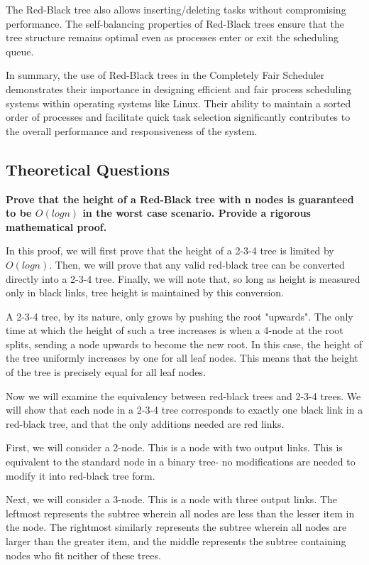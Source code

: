 \documentclass[12pt]{amsart}
\begin{document}
   The Red-Black tree also allows inserting/deleting tasks
   without compromising performance. The self-balancing
   properties of Red-Black trees ensure that the tree structure
   remains optimal even as processes enter or exit the
   scheduling queue.
   
   In summary, the use of Red-Black trees in the Completely Fair
   Scheduler demonstrates their  importance in designing
   efficient and fair process scheduling systems within
   operating systems like Linux. Their ability to maintain a
   sorted order of processes and facilitate quick task selection
   significantly contributes to the overall performance and
   responsiveness of the system.

\subsection{Theoretical Questions}

    \textbf{Prove that the height of a Red-Black tree with
    n nodes is guaranteed to be $O(log n)$ in the worst
    case scenario. Provide a rigorous mathematical proof.}
    
    In this proof, we will first prove that the height of a
    2-3-4 tree is limited by $O(log n)$. Then, we will prove
    that any valid red-black tree can be converted directly into
    a 2-3-4 tree. Finally, we will note that, so long as height
    is measured only in black links, tree height is maintained
    by this conversion.

    A 2-3-4 tree, by its nature, only grows by pushing the root
    "upwards". The only time at which the height of such a tree
    increases is when a 4-node at the root splits, sending a
    node upwards to become the new root. In this case, the
    height of the tree uniformly increases by one for all leaf
    nodes. This means that the height of the tree is precisely
    equal for all leaf nodes.

    Now we will examine the equivalency between red-black trees
    and 2-3-4 trees. We will show that each node in a 2-3-4 tree
    corresponds to exactly one black link in a red-black tree,
    and that the only additions needed are red links.

    First, we will consider a 2-node. This is a node with two
    output links. This is equivalent to the standard node in a
    binary tree- no modifications are needed to modify it into
    red-black tree form.

    Next, we will consider a 3-node. This is a node with three
    output links. The leftmost represents the subtree wherein
    all nodes are less than the lesser item in the node. The
    rightmost similarly represents the subtree wherein all nodes
    are larger than the greater item, and the middle represents
    the subtree containing nodes who fit neither of these trees.
\end{document}
